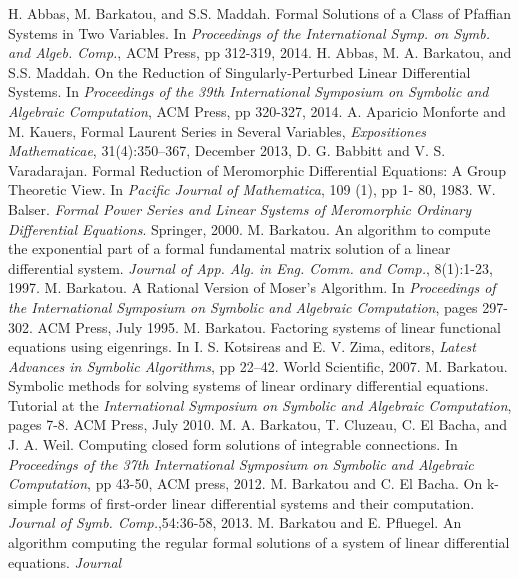 \documentclass[final,1p,times,number,amsthm]{elsart}
\begin{document}

\begin{thebibliography}{00}
 H. Abbas, M. Barkatou, and S.S. Maddah. Formal Solutions of a
  Class of Pfaffian Systems in Two Variables. In \textit{Proceedings of the
    International Symp. on Symb. and Algeb. Comp.}, ACM Press, pp 312-319, 2014.
 H. Abbas, M. A. Barkatou, and S.S. Maddah. On the Reduction of Singularly-Perturbed Linear Differential Systems. In \textit{Proceedings of the 39th International Symposium on Symbolic and Algebraic Computation}, ACM Press, pp 320-327, 2014.
 A. Aparicio Monforte and M. Kauers, Formal Laurent Series in
  Several Variables, \textit{Expositiones Mathematicae}, 31(4):350--367,
  December 2013,
   D. G. Babbitt and V. S. Varadarajan. Formal Reduction of Meromorphic Differential Equations: A Group Theoretic View. In \textit{Pacific Journal of Mathematica}, 109 (1), pp 1- 80, 1983.
 W. Balser. \textit{Formal Power Series and Linear Systems of
    Meromorphic Ordinary Differential Equations}. Springer, 2000.
 M. Barkatou. An algorithm to compute the exponential part of a
  formal fundamental matrix solution of a linear differential
  system. \textit{Journal of App. Alg. in Eng. Comm. and Comp.}, 8(1):1-23,
  1997.
 M. Barkatou. A Rational Version of Moser's Algorithm. In
  \textit{Proceedings of the International Symposium on Symbolic and Algebraic
    Computation}, pages 297-302. ACM Press, July 1995.
     M. Barkatou. Factoring systems of linear functional equations using eigenrings. In I. S. Kotsireas and E. V. Zima, editors, \textit{Latest Advances in Symbolic Algorithms}, pp 22--42. World Scientific, 2007.
       M. Barkatou. Symbolic methods for solving systems of linear ordinary differential equations. Tutorial at the
  \textit{International Symposium on Symbolic and Algebraic
    Computation}, pages 7-8. ACM Press, July 2010.
     M. A. Barkatou,  T. Cluzeau, C. El Bacha, and J. A. Weil. Computing closed form solutions of integrable connections. In \textit{Proceedings of the 37th International Symposium on Symbolic and Algebraic Computation}, pp 43-50, ACM press, 2012.
 M. Barkatou and C. El Bacha. On k-simple forms of first-order
  linear differential systems and their computation. \textit{Journal of
    Symb. Comp.},54:36-58, 2013.
 M. Barkatou and E. Pfluegel. An algorithm computing the regular
  formal solutions of a system of linear differential equations. \textit{Journal
}
\end{thebibliography}
\end{document}
